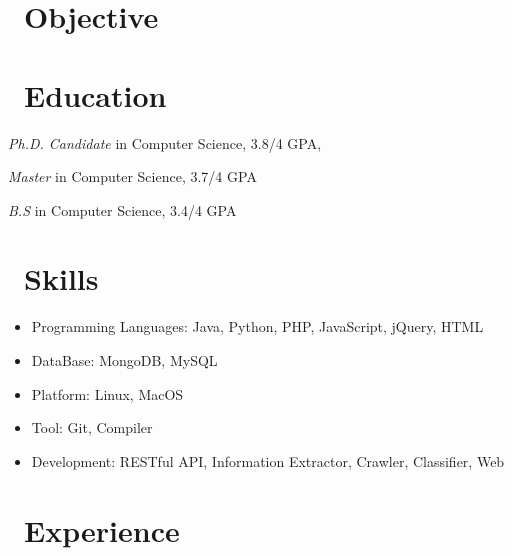 \documentclass{resume}
\begin{document}





\section{\faSearch\ Objective}



\section{\faGraduationCap\ Education}

\textit{Ph.D. Candidate} in Computer Science, 3.8/4 GPA,

\textit{Master} in Computer Science, 3.7/4 GPA

\textit{B.S} in Computer Science, 3.4/4 GPA


\section{\faCogs\ Skills}
\begin{itemize}[parsep=0.5ex]
  \item Programming Languages: Java, Python, PHP, JavaScript, jQuery, HTML
  \item DataBase: MongoDB, MySQL
  \item Platform: Linux, MacOS
  \item Tool: Git, Compiler
  \item Development: RESTful API, Information Extractor, Crawler, Classifier, Web
\end{itemize}


\section{\faUsers\ Experience}
\end{document}

